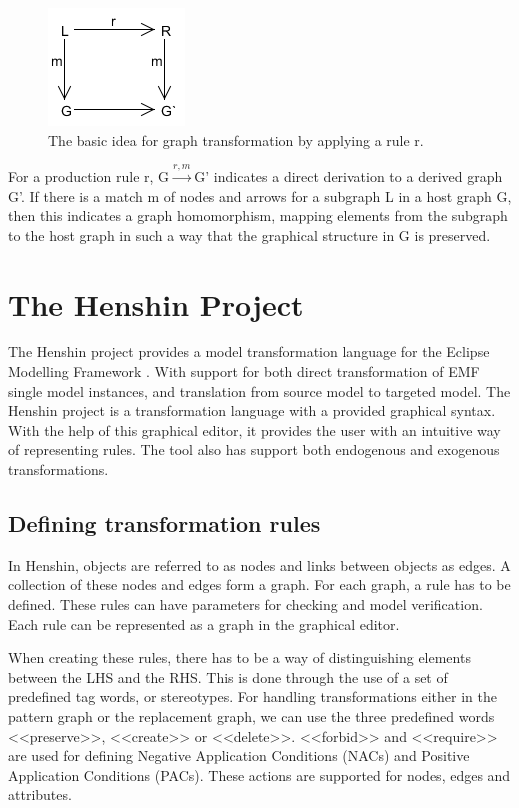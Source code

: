 \documentclass[pdftex,11pt,a4paper]{article}
\begin{document}
\begin{figure}[H]
	\centering
	\includegraphics[scale=0.7]{figures/GraphTransformationGeneral.png}
	\caption{The basic idea for graph transformation by applying a rule r.}
	\label{fig:GraphTransformationGeneral}
\end{figure}

For a production rule r, \mbox{G$\xrightarrow{r,m}$G'} indicates a direct
derivation to a derived graph G'. If there is a match m of nodes and arrows for a
subgraph L in a host graph G, then this indicates a graph homomorphism, mapping
elements from the subgraph to the host graph in such a way that the graphical
structure in G is preserved.

\section{The Henshin Project}

\noindent The Henshin project\cite{Henshin} provides a model transformation
language for the Eclipse Modelling Framework \cite{Steinberg2009}. With support for both direct 
transformation of EMF single model instances, and translation from source
model to targeted model. The Henshin project is a transformation language with a
provided graphical syntax. With the help of this graphical editor, it provides
the user with an intuitive way of representing rules. The tool also has support 
both endogenous and exogenous transformations.

\subsection{Defining transformation rules}

\noindent In Henshin, objects are referred to as nodes and links between objects
as edges. A collection of these nodes and edges form a graph. For each graph, a
rule has to be defined. These rules can have parameters for checking and model
verification. Each rule can be represented as a graph in the graphical
editor. 

\indent When creating these rules, there has to be a way of
distinguishing elements between the LHS and the RHS. This is done through the use of
a set of predefined tag words, or stereotypes. For handling transformations
either in the pattern graph or the replacement graph, we can use the three
predefined words <<preserve>>, <<create>> or <<delete>>. <<forbid>> and
<<require>> are used for defining Negative Application Conditions (NACs) and
Positive Application Conditions (PACs). These actions are supported for nodes,
edges and attributes.
\end{document}
